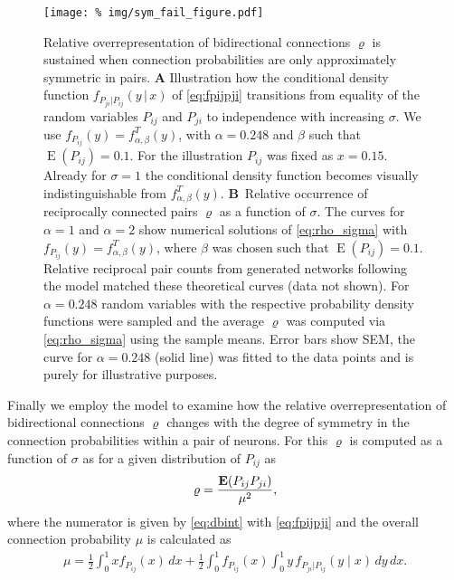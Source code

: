 \begin{figure}[h!]
\centering
\texttt{[image: \%
  img/sym\_fail\_figure.pdf]}
\caption{Relative overrepresentation of bidirectional connections $\varrho$ is sustained when connection probabilities are only approximately symmetric in pairs. \textbf{A} Illustration how the conditional density function $f_{P_{ji} | P_{ij}} (y\,\vert\, x)$ of \eqref{eq:fpijpji} transitions from equality of the random variables $P_{ij}$ and $P_{ji}$ to independence with increasing $\sigma$. We use $f_{P_{ij}} (y) = f^T_{\alpha,\beta}(y)$, with $\alpha=0.248$ and $\beta$ such that $\operatorname{E}(P_{ij})=0.1$. For the illustration $P_{ij}$ was fixed as $x=0.15$. Already for $\sigma=1$ the conditional density function becomes visually indistinguishable from  $f^T_{\alpha,\beta}(y)$. \textbf{B}~Relative occurrence of reciprocally connected pairs $\varrho$ as a function of $\sigma$. The curves for $\alpha=1$ and $\alpha=2$ show numerical solutions of \eqref{eq:rho_sigma} with $f_{P_{ij}}(y) = f_{\alpha,\beta}^T(y)$, where $\beta$ was chosen such that $\operatorname{E}(P_{ij}) = 0.1$. Relative reciprocal pair counts from generated networks following the model matched these theoretical curves (data not shown). For $\alpha = 0.248$ random variables with the respective probability density functions were sampled and the average $\varrho$ was computed via \eqref{eq:rho_sigma} using the sample means. Error bars show SEM, the curve for $\alpha = 0.248$ (solid line)  was fitted to the data points and is purely for illustrative purposes.} 
\label{fig:sym_fail}
\end{figure}


Finally we employ the model to examine how the relative overrepresentation of bidirectional connections $\varrho$ changes with the degree of symmetry in the connection probabilities within a pair of neurons. For this $\varrho$ is computed as a function of $\sigma$ as for a given distribution of $P_{ij}$ as
%
\begin{align}
  \varrho = \frac{\operatorname{\mathbf{E}}(P_{ij} P_{ji})}{\mu^2}, \label{eq:rho_sigma}
\end{align}
%
where the numerator is given by \eqref{eq:dbint} with %
\eqref{eq:fpijpji} %
%
%
and the overall connection probability $\mu$ is calculated as
%
\begin{align}
 \mu = \frac{1}{2} \int_0^1 x f_{P_{ij}}(x)\,dx + \frac{1}{2} \int_0^1 f_{P_{ij}}(x) \int_0^1 y \,f_{P_{ji}\vert P_{ij}}(y \mid x) \,dy \, dx.
\end{align}
%

